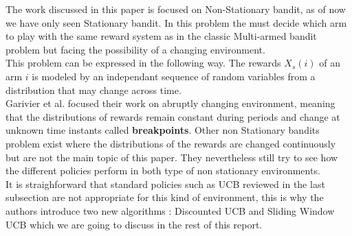The work discussed in this paper is focused on Non-Stationary bandit, as of now we have only seen Stationary bandit. In this problem the must decide which arm to play with the same reward system as in the classic Multi-armed bandit problem but facing the possibility of a changing environment.\\

This problem can be expressed in the following way. The rewards $X_s(i)$ of an arm $i$ is modeled by an independant sequence of random variables from a distribution that may change across time.\\

Garivier et al. focused their work on abruptly changing environment, meaning that the distributions of rewards remain constant during periods and change at unknown time instants called \textbf{breakpoints}. Other non Stationary bandits problem exist where the distributions of the rewards are changed continuously but are not the main topic of this paper. They nevertheless still try to see how the different policies perform in both type of non stationary environments.\\

It is straighforward that standard policies such as UCB reviewed in the last subsection are not appropriate for this kind of environment, this is why the authors introduce two new algorithms : Discounted UCB and Sliding Window UCB which we are going to discuss in the rest of this report.